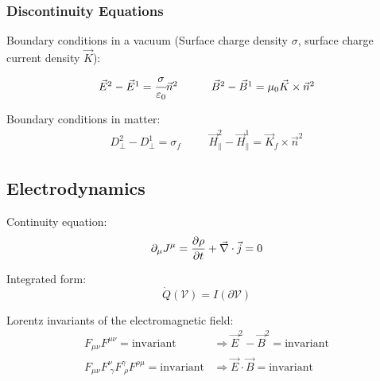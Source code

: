		\subsubsection{Discontinuity Equations}
			\noindent
			Boundary conditions in a vacuum (Surface charge density $\sigma$, surface charge current density $\vec{K}$):
		\begin{equation}
		\begin{array}{cc}
			\vec{E}^2 - \vec{E}^1 = \cfrac{\sigma}{\varepsilon_0}\Vec{n}^2
			&\hspace{20pt} \vec{B}^2 - \vec{B}^1 = \mu_0\vec{K}\times\Vec{n}^2
		\end{array}
		\end{equation}

			\noindent
			Boundary conditions in matter:
		\begin{equation}
		\begin{array}{cc}
			D_\perp^2 - D_\perp^1 = \sigma_f
			&\hspace{20pt} \vec{H}_\parallel^2 - \vec{H}_\parallel^1 = \vec{K}_f\times\Vec{n}^2
		\end{array}
		\end{equation}

	\subsection{Electrodynamics}
		\noindent
		Continuity equation:
		\begin{equation}
			\partial_\mu J^\mu = \pdv{\rho}{t} + \vec{\nabla}\cdot\vec{j} = 0
		\end{equation}

		\noindent
		Integrated form:
		\begin{equation}
			\dot{Q}(\mathcal{V}) = I(\partial\mathcal{V})
		\end{equation}

		\noindent
		Lorentz invariants of the electromagnetic field:
		\begin{equation}
			\begin{aligned}
				F_{\mu\nu} F^{\mu\nu} = \mathrm{invariant} &\Rightarrow \vec{E}^2 - \vec{B}^2 = \mathrm{invariant} \\
				F_{\mu\nu} F^{\nu}_{\;\gamma} F^{\gamma}_{\;\rho} F^{\rho\mu} = \mathrm{invariant} &\Rightarrow \vec{E}\cdot \vec{B} = \mathrm{invariant} \\
			\end{aligned}
		\end{equation}

